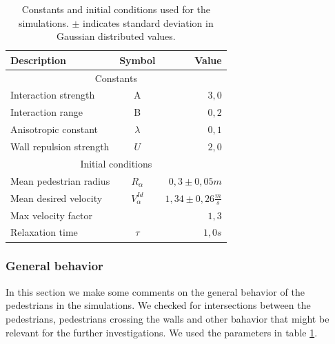 \begin{table}[ht]
    \begin{center}
        \begin{tabular}{l c r}
            \toprule
            \textbf{Description} & \textbf{Symbol} & \textbf{Value} \\
            \midrule
            \multicolumn{3}{c}{\textsf{Constants}}\\
            Interaction strength & A & $3,0$ \\
            Interaction range & B & $0,2$ \\
            Anisotropic constant & $\lambda$ & $0,1$ \\
            Wall repulsion strength & $U$ &  $2,0$ \\
            \midrule
            \multicolumn{3}{c}{\textsf{Initial conditions}}\\
            Mean pedestrian radius & $R_\alpha$ & $0,3 \pm 0,05 m$\\
            Mean desired velocity &  $V^{Id}_\alpha$ &  $1,34 \pm 0,26
            \frac{m}{s}$ \\
            Max velocity factor &  &  $1,3$ \\
            Relaxation time & $\tau$ & $1,0 s$\\
            \bottomrule
        \end{tabular}
        \caption[Constants and initial conditions]{Constants and initial
        conditions used for the simulations. $\pm$ indicates standard
        deviation in Gaussian distributed values.}
        \label{tbl:parameter-settings}
    \end{center}
\end{table}

\subsubsection{General behavior}
In this section we make some comments on the general behavior of 
the pedestrians in the simulations. We checked for intersections between 
the pedestrians, pedestrians crossing the walls and other bahavior that might 
be relevant for the further investigations. We used the parameters in table 
\ref{tbl:parameter-settings}.\\

